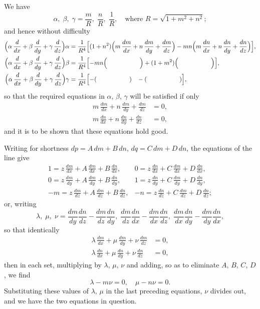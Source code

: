 \documentclass[11pt,a4paper]{book}
\begin{document}
We have
\[
\alpha,\; \beta,\; \gamma = \frac{m}{R},\; \frac{n}{R},\; \frac{1}{R}, \quad \text{where } R = \sqrt{1 + m^2 + n^2};
\]
and hence without difficulty
\begin{align*}
\Bigl(\alpha\,\frac{d}{dx} + \beta\,\frac{d}{dy} + \gamma\,\frac{d}{dz}\Bigr)\alpha &= \frac{1}{R^4}\Bigl[(1+n^2)\Bigl(m\,\frac{dm}{dx} + n\,\frac{dm}{dy} + \frac{dm}{dz}\Bigr) - mn\Bigl(m\,\frac{dn}{dx} + n\,\frac{dn}{dy} + \frac{dn}{dz}\Bigr)\Bigr], \\
\Bigl(\alpha\,\frac{d}{dx} + \beta\,\frac{d}{dy} + \gamma\,\frac{d}{dz}\Bigr)\beta &= \frac{1}{R^4}\Bigl[-mn\Bigl(\qquad\qquad\quad\;\Bigr) + (1+m^2)\Bigl(\qquad\qquad\quad\;\Bigr)\Bigr], \\
\Bigl(\alpha\,\frac{d}{dx} + \beta\,\frac{d}{dy} + \gamma\,\frac{d}{dz}\Bigr)\gamma &= \frac{1}{R^4}\Bigl[-(\qquad\qquad\quad\;)\;\;\; - (\qquad\qquad\quad\;)\Bigr],
\end{align*}
so that the required equations in $\alpha$, $\beta$, $\gamma$ will be satisfied if only
\begin{align*}
m\,\frac{dm}{dx} + n\,\frac{dm}{dy} + \frac{dm}{dz} &= 0, \\
m\,\frac{dn}{dx} + n\,\frac{dn}{dy} + \frac{dn}{dz} &= 0,
\end{align*}
and it is to be shown that these equations hold good.

Writing for shortness $dp = A\,dm + B\,dn$, $dq = C\,dm + D\,dn$, the equations of the line give
\[
\begin{array}{c|c}
\displaystyle 1 = z\,\frac{dm}{dx} + A\,\frac{dm}{dx} + B\,\frac{dn}{dx}, & \displaystyle 0 = z\,\frac{dn}{dx} + C\,\frac{dm}{dx} + D\,\frac{dn}{dx}, \\[8pt]
\displaystyle 0 = z\,\frac{dm}{dy} + A\,\frac{dm}{dy} + B\,\frac{dn}{dy}, & \displaystyle 1 = z\,\frac{dn}{dy} + C\,\frac{dm}{dy} + D\,\frac{dn}{dy}, \\[8pt]
\displaystyle -m = z\,\frac{dm}{dz} + A\,\frac{dm}{dz} + B\,\frac{dn}{dz}, & \displaystyle -n = z\,\frac{dn}{dz} + C\,\frac{dm}{dz} + D\,\frac{dn}{dz};
\end{array}
\]
or, writing
\[
\lambda,\; \mu,\; \nu = \frac{dm}{dy}\frac{dn}{dz} - \frac{dm}{dz}\frac{dn}{dy},\; \frac{dm}{dz}\frac{dn}{dx} - \frac{dm}{dx}\frac{dn}{dz},\; \frac{dm}{dx}\frac{dn}{dy} - \frac{dm}{dy}\frac{dn}{dx},
\]
so that identically
\begin{align*}
\lambda\,\frac{dm}{dx} + \mu\,\frac{dm}{dy} + \nu\,\frac{dm}{dz} &= 0, \\
\lambda\,\frac{dn}{dx} + \mu\,\frac{dn}{dy} + \nu\,\frac{dn}{dz} &= 0,
\end{align*}
then in each set, multiplying by $\lambda$, $\mu$, $\nu$ and adding, so as to eliminate $A$, $B$, $C$, $D$, we find
\[
\lambda - m\nu = 0, \quad \mu - n\nu = 0.
\]
Substituting these values of $\lambda$, $\mu$ in the last preceding equations, $\nu$ divides out, and we have the two equations in question.
\end{document}
